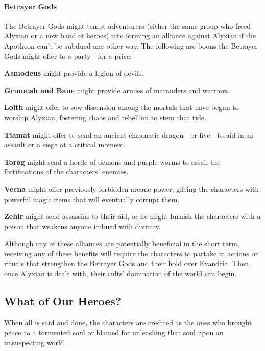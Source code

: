 \documentclass[letterpaper, 11pt, bg=full, twocolumn]{dndbook}
\begin{document}

\paragraph{Betrayer Gods}

The Betrayer Gods might tempt adventurers (either the same group who freed Alyxian or a new band of heroes) into forming an alliance against Alyxian if the Apotheon can't be subdued any other way. The following are boons the Betrayer Gods might offer to a party---for a price:

\textbf{Asmodeus} might provide a legion of devils.

\textbf{Gruumsh and Bane} might provide armies of marauders and warriors.

\textbf{Lolth} might offer to sow dissension among the mortals that have begun to worship Alyxian, fostering chaos and rebellion to stem that tide.

\textbf{Tiamat} might offer to send an ancient chromatic dragon---or five---to aid in an assault or a siege at a critical moment.

\textbf{Torog} might send a horde of demons and purple worms to assail the fortifications of the characters' enemies.

\textbf{Vecna} might offer previously forbidden arcane power, gifting the characters with powerful magic items that will eventually corrupt them.

\textbf{Zehir} might send assassins to their aid, or he might furnish the characters with a poison that weakens anyone imbued with divinity.

Although any of these alliances are potentially beneficial in the short term, receiving any of these benefits will require the characters to partake in actions or rituals that strengthen the Betrayer Gods and their hold over Exandria. Then, once Alyxian is dealt with, their cults' domination of the world can begin.

\subsection{What of Our Heroes?}

When all is said and done, the characters are credited as the ones who brought peace to a tormented soul or blamed for unleashing that soul upon an unsuspecting world.
\end{document}
